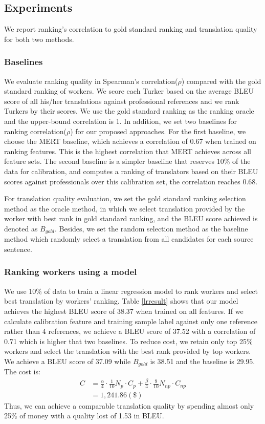 \documentclass[11pt,letterpaper]{article}
\begin{document}
\subsection{Experiments}
We report ranking's correlation to gold standard ranking and translation quality for both two methods.

\subsubsection{Baselines}
We evaluate ranking quality in Spearman's correlation($\rho$) compared with the gold standard ranking of workers. We score each Turker based on the average BLEU score of all his/her translations against professional references and we rank Turkers by their scores. We use the gold standard ranking as the ranking oracle and the upper-bound correlation is 1. In addition, we set two baselines for ranking correlation($\rho$) for our proposed approaches. For the first baseline,  we choose the MERT\cite{och2003minimum} baseline, which achieves a correlation of  0.67 when trained on ranking features. This is the highest correlation that  MERT achieves across all feature sets. The second baseline is a simpler baseline that reserves 10\% of the data for calibration, and computes a ranking of translators based on their BLEU scores against professionals over this calibration set, the correlation reaches 0.68.  

For translation quality evaluation, we set the gold standard ranking selection method as the oracle method, in which we select translation provided by the worker with best rank in gold standard ranking, and the BLEU score achieved is denoted as $B_{gold}$.
Besides, we set the random selection method as the baseline method which randomly select a translation from all candidates for each source sentence. 


\subsubsection{ Ranking workers using a model}
We use 10\% of data to train a linear regression model to rank workers and select best translation by workers' ranking. Table \ref{lrresult} shows that our model achieves the highest BLEU score of 38.37 when trained on all features. If we calculate calibration feature and training sample label against only one reference rather than 4 references, we achieve a BLEU score of 37.52 with a correlation of 0.71 which is higher that two baselines. To  reduce cost, we retain only top 25\% workers and select the translation with the best rank provided by top workers. We achieve a BLEU score of 37.09 while $B_{gold}$ is 38.51 and the baseline is 29.95. The cost is:
 \begin{align*}
  C& = \frac{\alpha}{4} \cdot \frac{1}{10} N_{p}\cdot C_{p}  + \frac{\beta}{4} \cdot \frac{9}{10} N_{np} \cdot C_{np}\\
   & = 1,241.86 (\$)
 \end{align*}
 Thus, we can achieve a comparable translation quality by spending almost only 25\% of money with a quality lost of 1.53 in BLEU.
 
\end{document}
